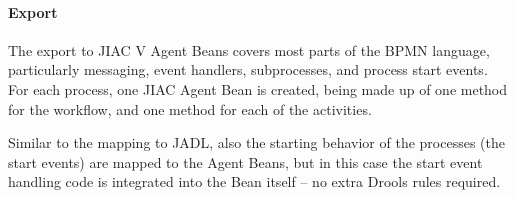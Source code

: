 \paragraph{Export}
The export to JIAC V Agent Beans covers most parts of the BPMN language,
particularly messaging, event handlers, subprocesses, and process start events.
For each process, one JIAC Agent Bean is created, being made up of one method for
the workflow, and one method for each of the activities.

Similar to the mapping to JADL, also the starting behavior of the processes (the
start events) are mapped to the Agent Beans, but in this case the start event
handling code is integrated into the Bean itself -- no extra Drools rules required.




%
%
%
%


